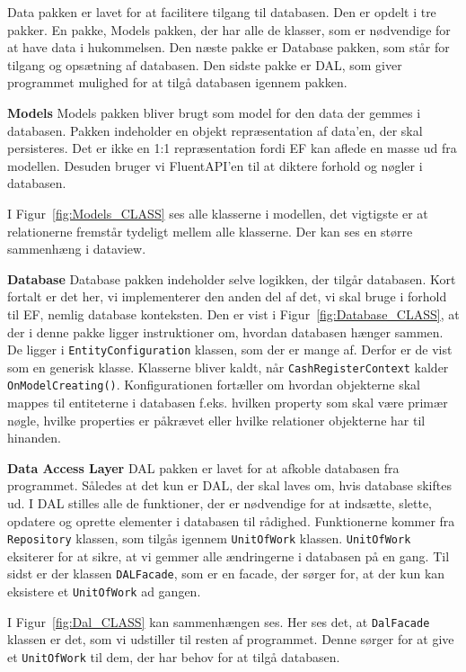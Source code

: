 Data pakken er lavet for at facilitere tilgang til databasen. Den er opdelt i tre pakker. En pakke, Models pakken, der har alle de klasser, som er nødvendige for at have data i hukommelsen. Den næste pakke er Database pakken, som står for tilgang og opsætning af databasen. Den sidste pakke er \gls{DAL}, som giver programmet mulighed for at tilgå databasen igennem pakken.
\newline\newline

\textbf{Models}\newline
Models pakken bliver brugt som model for den data der gemmes i databasen. Pakken indeholder en objekt repræsentation af data'en, der skal persisteres. Det er ikke en 1:1 repræsentation fordi \gls{EF} kan aflede en masse ud fra modellen. Desuden bruger vi \gls{FluentAPI}'en til at diktere forhold og nøgler i databasen.


I Figur~\ref{fig:Models_CLASS} ses alle klasserne i modellen, det vigtigste er at relationerne fremstår tydeligt mellem alle klasserne. Der kan ses en større sammenhæng i dataview.
\newline

\textbf{Database}\newline
Database pakken indeholder selve logikken, der tilgår databasen. Kort fortalt er det her, vi implementerer den anden del af det, vi skal bruge i forhold til \gls{EF}, nemlig database konteksten. 
Den er vist i Figur~\ref{fig:Database_CLASS}, at der i denne pakke ligger instruktioner om, hvordan databasen hænger sammen. De ligger i \texttt{EntityConfiguration} klassen, som der er mange af. Derfor er de vist som en generisk klasse.
Klasserne bliver kaldt, når \texttt{CashRegisterContext} kalder \texttt{OnModelCreating()}. Konfigurationen fortæller om hvordan objekterne skal mappes til entiteterne i databasen f.eks. hvilken property som skal være primær nøgle, hvilke properties er påkrævet eller hvilke relationer objekterne har til hinanden. 

\textbf{Data Access Layer}\newline
\gls{DAL} pakken er lavet for at afkoble databasen fra programmet. 
Således at det kun er \gls{DAL}, der skal laves om, hvis database skiftes ud. 
I \gls{DAL} stilles alle de funktioner, der er nødvendige for at indsætte, slette, opdatere og oprette elementer i databasen til rådighed. 
Funktionerne kommer fra \texttt{Repository} klassen, som tilgås igennem \texttt{UnitOfWork} klassen.
\texttt{UnitOfWork} eksiterer for at sikre, at vi gemmer alle ændringerne i databasen på en gang.
Til sidst er der klassen \texttt{DALFacade}, som er en facade, der sørger for, at der kun kan eksistere et \texttt{UnitOfWork} ad gangen. 


I Figur~\ref{fig:Dal_CLASS} kan sammenhængen ses. Her ses det, at \texttt{DalFacade} klassen er det, som vi udstiller til resten af programmet. Denne sørger for at give et \texttt{UnitOfWork} til dem, der har behov for at tilgå databasen.